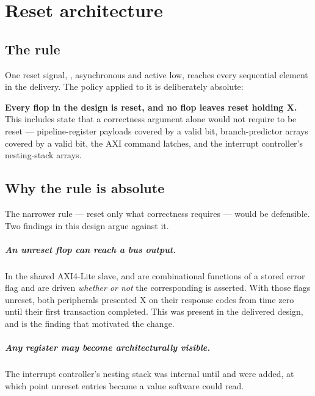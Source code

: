 \chapter{Reset architecture}
\label{ch:reset}

\section{The rule}

One reset signal, , asynchronous and active low, reaches every
sequential element in the delivery. The policy applied to it is deliberately
absolute:

\begin{rtlnote}
\textbf{Every flop in the design is reset, and no flop leaves reset holding X.}
This includes state that a correctness argument alone would not require to be
reset --- pipeline-register payloads covered by a valid bit, branch-predictor
arrays covered by a valid bit, the AXI command latches, and the interrupt
controller's nesting-stack arrays.
\end{rtlnote}

\section{Why the rule is absolute}

The narrower rule --- reset only what correctness requires --- would be
defensible. Two findings in this design argue against it.

\paragraph{An unreset flop can reach a bus output.} In the shared AXI4-Lite
slave,  and  are combinational functions of a stored error
flag and are driven \emph{whether or not} the corresponding  is
asserted. With those flags unreset, both peripherals presented X on their
response codes from time zero until their first transaction completed. This was
present in the delivered design, and is the finding that motivated the change.

\paragraph{Any register may become architecturally visible.} The interrupt
controller's nesting stack was internal until  and
 were added, at which point unreset entries became a value
software could read.

